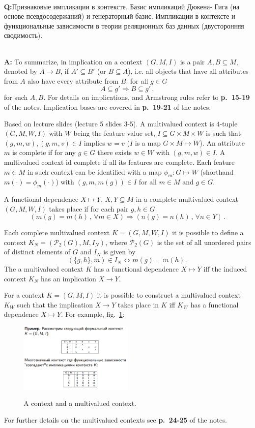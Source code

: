 \documentclass[a4paper]{article}
\newcommand{\rus}[1]{\foreignlanguage{russian}{#1}}
\begin{document}
\hfill\\\textbf{Q:}\rus{Признаковые импликации в контексте. Базис импликаций Дюкена-
Гига (на основе псевдосодержаний) и генераторный базис. Импликации в контексте и
функциональные зависимости в теории реляционных баз данных (двусторонняя сводимость).}

\hfill\\\textbf{A:}
To summarize, in implication on a context $(G, M, I)$ is a pair $A, B\subseteq M$,
denoted by $A\to B$, if $A'\subseteq B'$ (or $B\subseteq  A$), i.e. all objects that
have all attributes from $A$ also have every attribute from $B$: for all $g\in G$
$$ A\subseteq g' \Rightarrow B \subseteq g'\,, $$
for such $A, B$. For details on implications, and Armstrong rules refer to \textbf{p.~15-19}
of the notes. Implication bases are covered in \textbf{p.~19-21} of the notes.

Based on lecture slides (lecture 5 slides 3-5). A multivalued context is $4$-tuple
$(G, M, W, I)$ with $W$ being the feature value set, $I\subseteq G\times M \times W$
is such that $(g,m,w), (g,m,v)\in I$ implies $w=v$ ($I$ is a map $G\times M\mapsto W$).
An attribute $m$ is complete if for any $g \in G$ there exists $w\in W$ with $(g,m,w)
\in I$. A multivalued context id complete if all its features are complete.
Each feature $m\in M$ in such context can be identified with a map $\phi_m:G\mapsto W$
(shorthand $m(\cdot) = \phi_m(\cdot)$) with $(g, m, m(g))\in I$ for all $m\in M$
and $g\in G$.

A functional dependence $X\mapsto Y$, $X, Y\subseteq M$ in a complete multivalued
context $(G, M, W, I)$ takes place if for each pair $g, h\in G$
$$ (m(g) = m(h)\,,\, \forall m\in X)
    \Rightarrow (n(g) = n(h)\,,\, \forall n\in Y)
    \,. $$

Each complete multivalued context $K = (G, M, W, I)$ it is possible to define a context
$K_N = (\mathcal{P}_2(G), M, I_N)$, where $\mathcal{P}_2(G)$ is the set of all unordered
pairs of distinct elements of $G$ and $I_N$ is given by
$$ (\{g, h\}, m) \in I_N
    \Leftrightarrow m(g) = m(h)
    \,. $$
The a multivalued context $K$ has a functional dependence $X\mapsto Y$ iff the induced
context $K_N$ has an implication $X\to Y$.

For a context $K=(G, M, I)$ it is possible to construct a multivalued context
$K_W$ such that the implication $X\to Y$ takes place in $K$ iff $K_W$ has a functional
dependence $X\mapsto Y$. For example, fig.~\ref{fig:multivalued}:
\begin{figure}
    \centering
    \includegraphics[width=0.5\textwidth]{multivalued.png}
    \label{fig:multivalued}
    \caption{A context and a multivalued context.}
\end{figure}
For further details on the multivalued contexts see \textbf{p.~24-25} of the notes.
\end{document}
